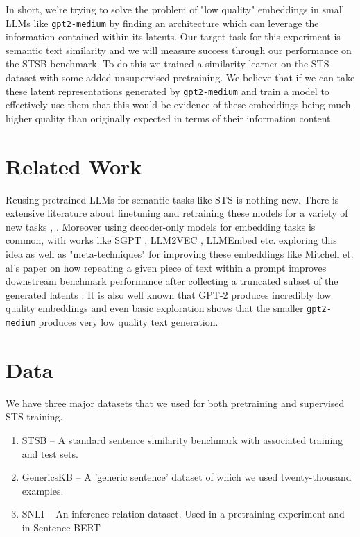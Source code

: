 \documentclass[14pt]{article}
\begin{document}
In short, we're trying to solve the problem of "low quality" embeddings in small LLMs like \verb|gpt2-medium| by finding an architecture which can leverage the information contained within its latents. Our target task for this experiment is semantic text similarity and we will measure success through our performance on the STSB \cite{STS} benchmark. To do this we trained a similarity learner on the STS dataset with some added unsupervised pretraining. We believe that if we can take these latent representations generated by \verb|gpt2-medium| and train a model to effectively use them that this would be evidence of these embeddings being much higher quality than originally expected in terms of their information content.

\section{Related Work}
Reusing pretrained LLMs for semantic tasks like STS is nothing new. There is extensive literature about finetuning and retraining
these models for a variety of new tasks \cite{reimers2019sentencebertsentenceembeddingsusing}, \cite{tang2024poolingattentioneffectivedesigns}. Moreover using decoder-only models for embedding tasks is common, with works like
SGPT \cite{muennighoff2022sgptgptsentenceembeddings}, LLM2VEC \cite{LLM2Vec}, LLMEmbed \cite{LLMEmbed} etc. exploring this idea as well as "meta-techniques" for improving these embeddings like Mitchell et. al's paper on how repeating a given piece of text within a prompt improves downstream benchmark performance after collecting a truncated subset of the generated latents \cite{RepImprovesLLM}. It is also well known that GPT-2 produces incredibly low quality embeddings \cite{ethayarajh2019contextualcontextualizedwordrepresentations} and even basic exploration shows that the smaller \verb|gpt2-medium| produces very low quality text generation.

\section{Data}
We have three major datasets that we used for both pretraining and supervised STS training.
\begin{enumerate}
    \item STSB \cite{STS} -- A standard sentence similarity benchmark with associated training and test sets.
    \item GenericsKB \cite{bhakthavatsalam2020genericskbknowledgebasegeneric} -- A 'generic sentence' dataset of which we used twenty-thousand examples.
    \item SNLI \cite{snli} -- An inference relation dataset. Used in a pretraining experiment and in Sentence-BERT \cite{reimers2019sentencebertsentenceembeddingsusing}
\end{enumerate}
\end{document}

